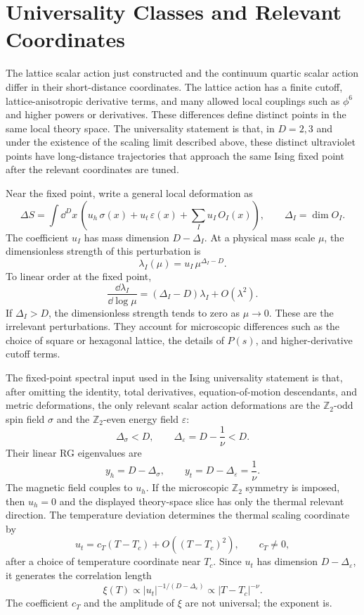 \section{Universality Classes and Relevant Coordinates}

The lattice scalar action just constructed and the continuum quartic scalar
action differ in their short-distance coordinates.  The lattice action has a
finite cutoff, lattice-anisotropic derivative terms, and many allowed local
couplings such as \(\phi^6\) and higher powers or derivatives.  These
differences define distinct points in the same local theory space.  The
universality statement is that, in \(D=2,3\) and under the existence of the
scaling limit described above, these distinct ultraviolet points have
long-distance trajectories that approach the same Ising fixed point after the
relevant coordinates are tuned.

Near the fixed point, write a general local deformation as
\[
  \Delta S
  =
  \int\dd^Dx\,
  \left(
    u_h\,\sigma(x)
    +
    u_t\,\varepsilon(x)
    +
    \sum_I u_I\,O_I(x)
  \right),
  \qquad
  \Delta_I=\dim O_I .
\]
The coefficient \(u_I\) has mass dimension \(D-\Delta_I\).  At a physical mass
scale \(\mu\), the dimensionless strength of this perturbation is
\[
  \lambda_I(\mu)=u_I\,\mu^{\Delta_I-D}.
\]
To linear order at the fixed point,
\[
  \frac{\dd\lambda_I}{\dd\log\mu}
  =
  (\Delta_I-D)\lambda_I+O(\lambda^2).
\]
If \(\Delta_I>D\), the dimensionless strength tends to zero as \(\mu\to0\).
These are the irrelevant perturbations.  They account for microscopic
differences such as the choice of square or hexagonal lattice, the details of
\(P(s)\), and higher-derivative cutoff terms.

The fixed-point spectral input used in the Ising universality statement is
that, after omitting the identity, total derivatives, equation-of-motion
descendants, and metric deformations, the only relevant scalar action
deformations are the \(\mathbb Z_2\)-odd spin field \(\sigma\) and the
\(\mathbb Z_2\)-even energy field \(\varepsilon\):
\[
  \Delta_\sigma<D,
  \qquad
  \Delta_\varepsilon=D-\frac1\nu<D .
\]
Their linear RG eigenvalues are
\[
  y_h=D-\Delta_\sigma,
  \qquad
  y_t=D-\Delta_\varepsilon=\frac1\nu .
\]
The magnetic field couples to \(u_h\).  If the microscopic \(\mathbb Z_2\)
symmetry is imposed, then \(u_h=0\) and the displayed theory-space slice has
only the thermal relevant direction.  The temperature deviation determines the
thermal scaling coordinate by
\[
  u_t
  =
  c_T(T-T_c)+O((T-T_c)^2),
  \qquad
  c_T\neq0 ,
\]
after a choice of temperature coordinate near \(T_c\).  Since \(u_t\) has
dimension \(D-\Delta_\varepsilon\), it generates the correlation length
\[
  \xi(T)
  \propto
  |u_t|^{-1/(D-\Delta_\varepsilon)}
  \propto
  |T-T_c|^{-\nu}.
\]
The coefficient \(c_T\) and the amplitude of \(\xi\) are not universal; the
exponent is.

